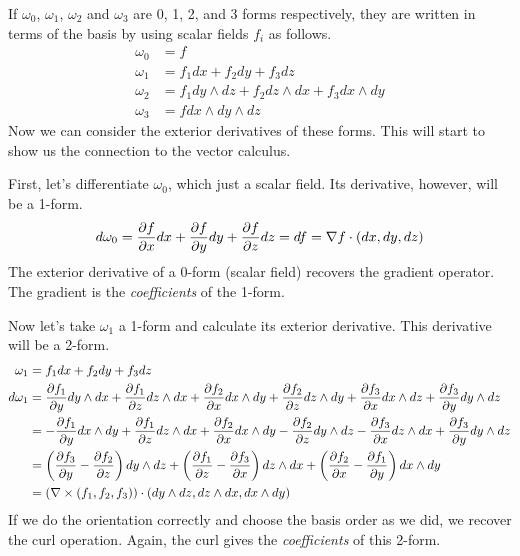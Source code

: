 \documentclass[fleqn,letterpaper]{report}
\begin{document}
If $\omega_0$, $\omega_1$, $\omega_2$ and $\omega_3$
are 0, 1, 2, and 3 forms respectively, they are written in
terms of the basis by using scalar fields $f_i$ as follows.
\begin{align*}
\omega_0 & = f \\
\omega_1 & = f_1 dx + f_2 dy + f_3 dz \\
\omega_2 & = f_1 dy\wedge dz + f_2 dz\wedge dx + f_3 dx \wedge dy \\
\omega_3 & = f dx \wedge dy \wedge dz
\end{align*}
Now we can consider the exterior derivatives of these forms.
This will start to show us the connection to the vector
calculus.

First, let's differentiate $\omega_0$, which just a scalar
field. Its derivative, however, will be a 1-form.
\begin{equation*}
d \omega_0 = \frac{\partial f}{\partial x} dx + \frac{\partial f}{\partial y}
dy + \frac{\partial f}{\partial z} dz = 
df = \nabla f \cdot (dx, dy, dz)
\end{equation*}
The exterior derivative of a 0-form (scalar field) recovers
the gradient operator. The gradient is the \emph{coefficients}
of the 1-form.

Now let's take $\omega_1$ a 1-form and calculate its exterior
derivative. This derivative will be a 2-form.
\begin{align*}
\omega_1 & = f_1 dx + f_2 dy + f_3 dz \\
d \omega_1 & = 
\frac{\partial f_1}{\partial y} dy \wedge dx + 
\frac{\partial f_1}{\partial z} dz \wedge dx + 
\frac{\partial f_2}{\partial x} dx \wedge dy + 
\frac{\partial f_2}{\partial z} dz \wedge dy + 
\frac{\partial f_3}{\partial x} dx \wedge dz + 
\frac{\partial f_3}{\partial y} dy \wedge dz \\
& = 
- \frac{\partial f_1}{\partial y} dx \wedge dy + 
\frac{\partial f_1}{\partial z} dz \wedge dx + 
\frac{\partial f_2}{\partial x} dx \wedge dy - 
\frac{\partial f_2}{\partial z} dy \wedge dz - 
\frac{\partial f_3}{\partial x} dz \wedge dx + 
\frac{\partial f_3}{\partial y} dy \wedge dz \\
& = 
\left( 
\frac{\partial f_3}{\partial y} - \frac{\partial f_2}{\partial z} 
\right) 
dy \wedge dz + 
\left( 
\frac{\partial f_1}{\partial z} - \frac{\partial f_3}{\partial x} 
\right) 
dz \wedge dx + 
\left( 
\frac{\partial f_2}{\partial x} - \frac{\partial f_1}{\partial y} 
\right) 
dx \wedge dy \\
& = \left( \nabla \times (f_1, f_2, f_3) \right) \cdot
(dy \wedge dz, dz \wedge dx, dx \wedge dy)
\end{align*}
If we do the orientation correctly and choose the basis order
as we did, we recover the curl operation. Again, the curl
gives the \emph{coefficients} of this 2-form.
\end{document}
